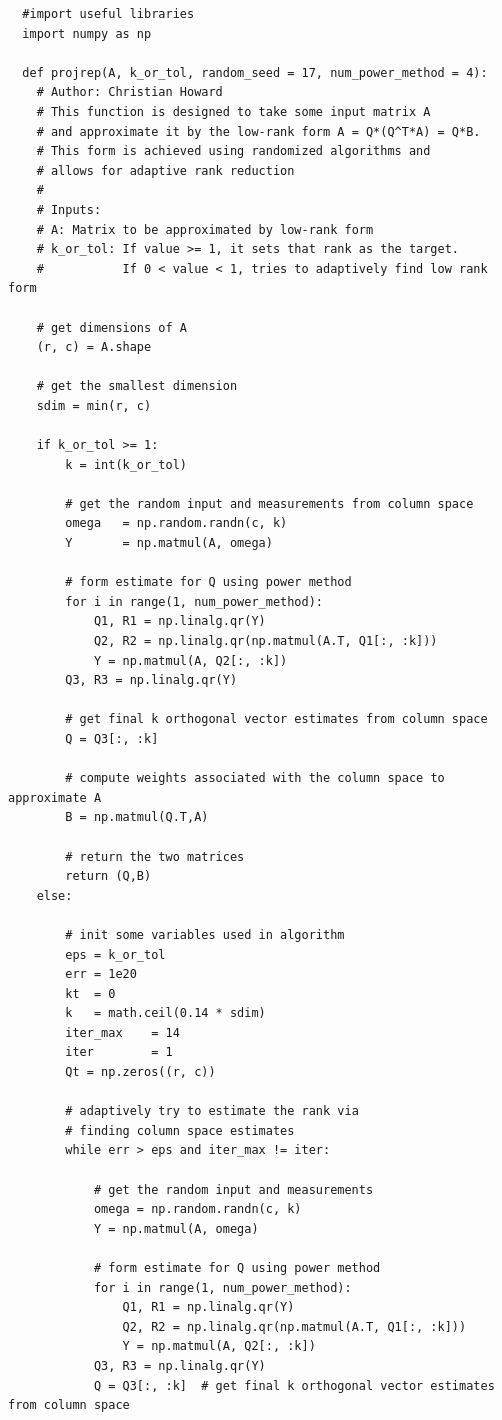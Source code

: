 \documentclass{article}[12pt]
\begin{document}
\newpage
\begin{verbatim}
  #import useful libraries
  import numpy as np

  def projrep(A, k_or_tol, random_seed = 17, num_power_method = 4):
    # Author: Christian Howard
    # This function is designed to take some input matrix A
    # and approximate it by the low-rank form A = Q*(Q^T*A) = Q*B.
    # This form is achieved using randomized algorithms and
    # allows for adaptive rank reduction
    #
    # Inputs:
    # A: Matrix to be approximated by low-rank form
    # k_or_tol: If value >= 1, it sets that rank as the target.
    #           If 0 < value < 1, tries to adaptively find low rank form

    # get dimensions of A
    (r, c) = A.shape

    # get the smallest dimension
    sdim = min(r, c)

    if k_or_tol >= 1:
        k = int(k_or_tol)

        # get the random input and measurements from column space
        omega   = np.random.randn(c, k)
        Y       = np.matmul(A, omega)

        # form estimate for Q using power method
        for i in range(1, num_power_method):
            Q1, R1 = np.linalg.qr(Y)
            Q2, R2 = np.linalg.qr(np.matmul(A.T, Q1[:, :k]))
            Y = np.matmul(A, Q2[:, :k])
        Q3, R3 = np.linalg.qr(Y)

        # get final k orthogonal vector estimates from column space
        Q = Q3[:, :k]

        # compute weights associated with the column space to approximate A
        B = np.matmul(Q.T,A)

        # return the two matrices
        return (Q,B)
    else:

        # init some variables used in algorithm
        eps = k_or_tol
        err = 1e20
        kt  = 0
        k   = math.ceil(0.14 * sdim)
        iter_max    = 14
        iter        = 1
        Qt = np.zeros((r, c))

        # adaptively try to estimate the rank via
        # finding column space estimates
        while err > eps and iter_max != iter:

            # get the random input and measurements
            omega = np.random.randn(c, k)
            Y = np.matmul(A, omega)

            # form estimate for Q using power method
            for i in range(1, num_power_method):
                Q1, R1 = np.linalg.qr(Y)
                Q2, R2 = np.linalg.qr(np.matmul(A.T, Q1[:, :k]))
                Y = np.matmul(A, Q2[:, :k])
            Q3, R3 = np.linalg.qr(Y)
            Q = Q3[:, :k]  # get final k orthogonal vector estimates from column space


\end{verbatim}
\end{document}
